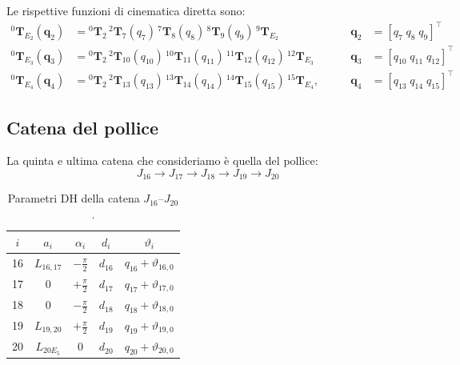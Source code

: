 Le rispettive funzioni di cinematica diretta sono:
\begin{align}
    {}^0\boldsymbol{T}_{E_2}(\mathbf q_2)&=
    {}^0\boldsymbol{T}_2\,{}^2\boldsymbol{T}_7(q_7)\,{}^7\boldsymbol{T}_8(q_8)\,
    {}^8\boldsymbol{T}_9(q_9)\,{}^9\boldsymbol{T}_{E_2}
    &\qquad
    \mathbf q_2&=[q_7\;q_8\;q_9]^\top
    \\
    {}^0\boldsymbol{T}_{E_3}(\mathbf q_3)&=
    {}^0\boldsymbol{T}_2\,{}^2\boldsymbol{T}_{10}(q_{10})\,{}^{10}\boldsymbol{T}_{11}(q_{11})\,
    {}^{11}\boldsymbol{T}_{12}(q_{12})\,{}^{12}\boldsymbol{T}_{E_3}
    &\qquad
    \mathbf q_3&=[q_{10}\;q_{11}\;q_{12}]^\top
    \\
    {}^0\boldsymbol{T}_{E_4}(\mathbf q_4)&=
    {}^0\boldsymbol{T}_2\,{}^2\boldsymbol{T}_{13}(q_{13})\,{}^{13}\boldsymbol{T}_{14}(q_{14})\,
    {}^{14}\boldsymbol{T}_{15}(q_{15})\,{}^{15}\boldsymbol{T}_{E_4},
    &\qquad
    \mathbf q_4&=[q_{13}\;q_{14}\;q_{15}]^\top
\end{align}

\subsection{Catena del pollice}

La quinta e ultima catena che consideriamo è quella del pollice:
\[
    J_{16}\rightarrow J_{17}\rightarrow J_{18}\rightarrow J_{19}\rightarrow J_{20}
\]

\begin{table}[htbp]
    \centering
    \renewcommand{\arraystretch}{1.1}
    \begin{tabular}{|c|c|c|c|c|}
    \hline
    $i$&$a_i$&$\alpha_i$&$d_i$&$\vartheta_i$\\ \hline \hline
    16&$L_{16,17}$&$-\frac\pi2$&$d_{16}$&$q_{16}+\vartheta_{16,0}$\\
    17&0&$+\frac\pi2$&$d_{17}$&$q_{17}+\vartheta_{17,0}$\\
    18&0&$-\frac\pi2$&$d_{18}$&$q_{18}+\vartheta_{18,0}$\\
    19&$L_{19,20}$&$+\frac\pi2$&$d_{19}$&$q_{19}+\vartheta_{19,0}$\\
    20&$L_{20E_5}$&$0$&$d_{20}$&$q_{20}+\vartheta_{20,0}$\\
    \hline
    \end{tabular}
    \caption{Parametri DH della catena $J_{16}$--$J_{20}$.}
    \label{tab:dh_16_20}
\end{table}

